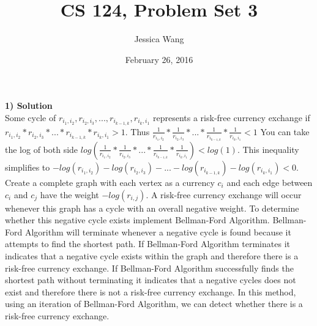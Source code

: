 \documentclass[11pt]{article}
\title{CS 124, Problem Set 3}
\author{Jessica Wang}
\date{February 26, 2016}
\begin{document}
\maketitle
\textbf{1) Solution}\\
Some cycle of $r_{i_1,i_2}, r_{i_2,i_3}, ... , r_{i_{k-1,k}},r_{i_k,i_1}$ represents a risk-free currency exchange if $r_{i_1,i_2}* r_{i_2,i_3}* ... * r_{i_{k-1,k}}*r_{i_k,i_1} > 1$. Thus $\frac{1}{r_{i_1,i_2}}* \frac{1}{r_{i_2,i_3}}* ... *\frac{1}{r_{i_{k-1,k}}}*\frac{1}{r_{i_k,i_1}} < 1$ You can take the log of both side $log(\frac{1}{r_{i_1,i_2}}* \frac{1}{r_{i_2,i_3}}* ... *\frac{1}{r_{i_{k-1,k}}}*\frac{1}{r_{i_k,i_1}}) < log (1)$. This inequality simplifies to $-log(r_{i_1,i_2}) - log( r_{i_2,i_3}) - ... - log(r_{i_{k-1,k}}) - log(r_{i_k,i_1}) < 0$. Create a complete graph with each vertex as a currency $c_i$ and each edge between $c_i$ and $c_j$ have the weight $-log(r_{i,j})$. A risk-free currency exchange will occur whenever this graph has a cycle with an overall negative weight. To determine whether this negative cycle exists implement Bellman-Ford Algorithm. Bellman-Ford Algorithm will terminate whenever a negative cycle is found because it attempts to find the shortest path. If Bellman-Ford Algorithm terminates it indicates that a negative cycle exists within the graph and therefore there is a risk-free currency exchange. If Bellman-Ford Algorithm successfully finds the shortest path without terminating it indicates that a negative cycles does not exist and therefore there is not a risk-free currency exchange. In this method, using an iteration of Bellman-Ford Algorithm, we can detect whether there is a risk-free currency exchange. \\
\end{document}
